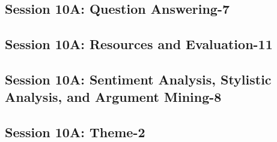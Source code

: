 \subsection{\large Session 10A: Question Answering-7}
\label{parallel-session-10A-trackD}
\TrackDLoc\hfill\sessionchair{}{}
\clearpage
\subsection{\large Session 10A: Resources and Evaluation-11}
\label{parallel-session-10A-trackE}
\TrackELoc\hfill\sessionchair{}{}
\clearpage
\subsection{\large Session 10A: Sentiment Analysis, Stylistic Analysis, and Argument Mining-8}
\label{parallel-session-10A-trackF}
\TrackFLoc\hfill\sessionchair{}{}
\clearpage
\subsection{\large Session 10A: Theme-2}
\label{parallel-session-10A-trackG}
\TrackGLoc\hfill\sessionchair{}{}
\clearpage


